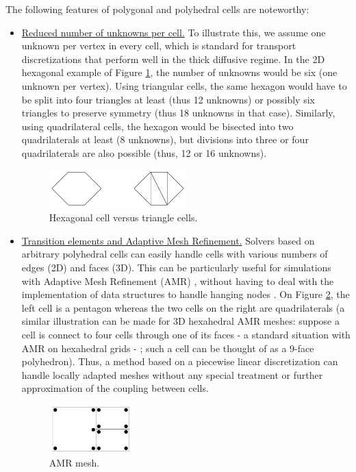 The following features of polygonal and polyhedral cells are noteworthy:
\begin{itemize}
 \item \underline{Reduced number of unknowns per cell.} To illustrate this, we
   assume one unknown per vertex in every cell, which is standard for
   transport discretizations that perform well in the thick diffusive regime.
   In the 2D hexagonal example of Figure \ref{fig_hexa_split}, the number of
   unknowns would be six (one unknown per vertex). Using triangular cells, the
   same hexagon would have to be split into four triangles at least (thus 12
   unknowns) or possibly six triangles to preserve symmetry (thus 18 unknowns in
   that case). Similarly, using quadrilateral cells, the hexagon would be
   bisected into two quadrilaterals at least (8 unknowns), but divisions into
   three or four quadrilaterals are also possible (thus, 12 or 16 unknowns).
   \begin{figure}[H]
   \centering
   \includegraphics[width=0.5\textwidth]{./Dsa/hex_tri_cells}
   \caption{Hexagonal cell versus triangle cells.}
   \label{fig_hexa_split}
   \end{figure}
 \item \underline{Transition elements and Adaptive Mesh Refinement.} Solvers
   based on arbitrary polyhedral cells can easily handle cells with various
   numbers of edges (2D) and faces (3D). This can be particularly useful for
   simulations with Adaptive Mesh Refinement (AMR)
   \cite{amr_rad,amr_block,amr_unstruc}, without having to deal with the
   implementation of data structures to handle hanging nodes
   \cite{arbitrary_hanging_nodes,dealII_hanging_nodes,locally_hanging_nodes}.
   On Figure \ref{fig_amr}, the left cell is a pentagon whereas the two cells 
   on the right
   are quadrilaterals (a similar illustration can be made for 3D hexahedral
   AMR meshes: suppose a cell is connect to four cells through one of its faces
   - a standard situation with AMR on hexahedral grids - ; such a cell can be
   thought of as a 9-face polyhedron). Thus, a method based on a piecewise linear
   discretization can handle locally adapted meshes without any special
   treatment or further approximation of the coupling between cells.
   \begin{figure}[H]
   \centering
   \includegraphics[width=0.3\textwidth]{./Dsa/amr}
   \caption{AMR mesh.}
   \label{fig_amr}
   \end{figure}
\end{itemize}
